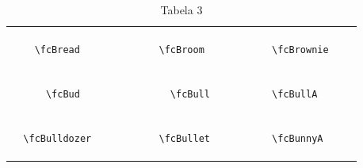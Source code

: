 \documentclass[x11names]{article}
\begin{document}
\begin{table}[H]
\begin{tabular}{|c|c|c|c|c|c|}
		&\multirow{5}{*}{	\fcBread	[scale=0.16]} & &\multirow{5}{*}{	\fcBroom	[scale=0.25]} & &\multirow{5}{*}{	\fcBrownie	[scale=0.16]}\\	& & & & & \\	& & & & & \\	\verb|	\fcBread	| & & \verb|	\fcBroom	| & & \verb|	\fcBrownie	| & \\	& & & & & \\	& & & & & \\	& & & & & \\	\hline									
		&\multirow{5}{*}{	\fcBud	[scale=0.16]} & &\multirow{5}{*}{	\fcBull	[scale=0.64]} & &\multirow{5}{*}{	\fcBullA	[scale=0.16]}\\	& & & & & \\	& & & & & \\	\verb|	\fcBud	| & & \verb|	\fcBull	| & & \verb|	\fcBullA	| & \\	& & & & & \\	& & & & & \\	& & & & & \\	\hline									
		&\multirow{5}{*}{	\fcBulldozer	[scale=0.16]} & &\multirow{5}{*}{	\fcBullet	[scale=0.64]} & &\multirow{5}{*}{	\fcBunnyA	[scale=0.16]}\\	& & & & & \\	& & & & & \\	\verb|	\fcBulldozer	| & & \verb|	\fcBullet	| & & \verb|	\fcBunnyA	| & \\	& & & & & \\	& & & & & \\	& & & & & \\		\hline 	\hline 	\end{tabular}	\caption{	Tabela 3	}\label{	Tab3	}\end{table}
\end{document}
